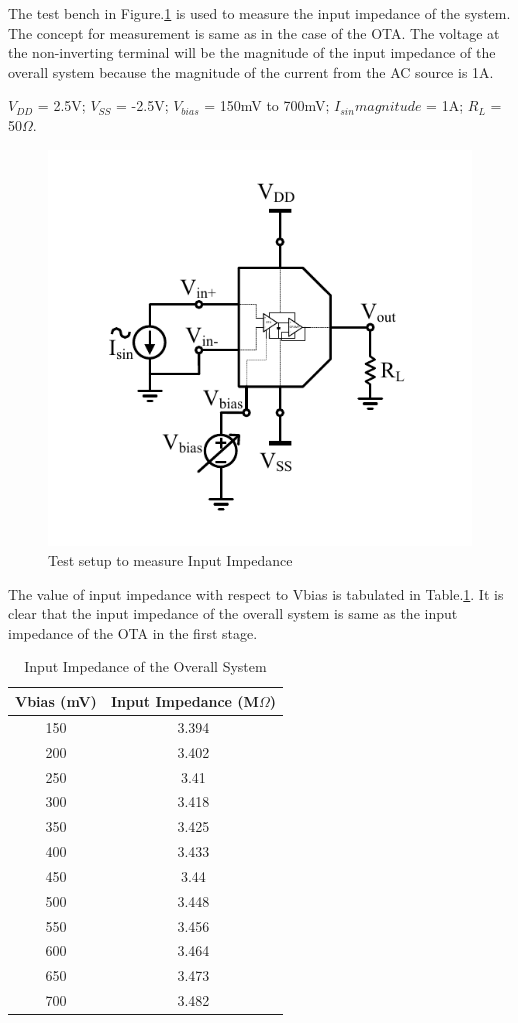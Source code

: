 The test bench in Figure.\ref{fig:TB_ZIN} is used to measure the input impedance of the system. The concept for measurement is same as in the case of the OTA. The voltage at the non-inverting terminal will be the magnitude of the input impedance of the overall system because the magnitude of the current from the AC source is 1A.

$V_{DD}$ = 2.5V; $V_{SS}$ = -2.5V; $V_{bias}$ = 150mV to 700mV;  $I_{sin} magnitude$ = 1A; $R_{L}$ = 50$\Omega$.
\begin{figure} [H]
\centering
\includegraphics[scale=1]{Figures/Test_Benches/Overall/ZIN.pdf}
\caption{Test setup to measure Input Impedance}
\label{fig:TB_ZIN}
\end{figure}

The value of input impedance with respect to Vbias is tabulated in Table.\ref{tab:ZIN}. It is clear that the input impedance of the overall system is same as the input impedance of the OTA in the first stage.

\begin{table} [H]
\centering
\begin{tabular}{@{}cc@{}}
\toprule
Vbias (mV)			& Input Impedance (M$\Omega$)	\\ \midrule
150					& 3.394  \\
200					& 3.402  \\
250					& 3.41   \\
300					& 3.418	 \\
350					& 3.425	 \\
400					& 3.433	 \\
450					& 3.44  \\
500					& 3.448 \\
550					& 3.456 \\
600					& 3.464 \\
650					& 3.473 \\
700 				& 3.482 \\
\bottomrule
\end{tabular}
\caption{Input Impedance of the Overall System}
\label{tab:ZIN}
\end{table}


